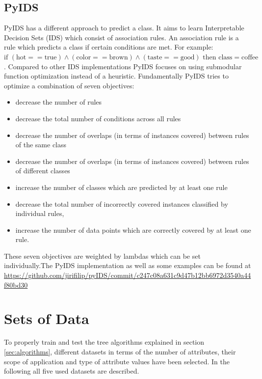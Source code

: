 \documentclass[a4paper,preprint]{sig-alternate-xt}
\begin{document}
\subsection{PyIDS}
\label{subsec:pyschwachsinn}
PyIDS has a different approach to predict a class.
It aims to learn Interpretable Decision Sets (IDS) which consist of association rules. An association rule is a rule which predicts a class if certain conditions are met. For example: $\text{if } (\text{hot}==\text{true}) \land (\text{color}==\text{brown}) \land  (\text{taste}==\text{good}) \text{ then } \text{class}=\text{coffee}$. Compared to other IDS implementations PyIDS focuses on using submodular function optimization instead of a heuristic.
Fundamentally PyIDS tries to optimize a combination of seven objectives:
\begin{itemize}
    \item decrease the number of rules
    \item decrease the total number of conditions across all rules
    \item decrease the number of overlaps (in terms of instances covered) between rules of the same class
    \item decrease the number of overlaps (in terms of instances covered) between rules of different classes
    \item increase the number of classes which are predicted by at least one rule
    \item decrease the total number of incorrectly covered instances classified by individual rules,
    \item increase the number of data points which are correctly covered by at least one rule.
\end{itemize}

These seven objectives are weighted by lambdas which can be set individually.The PyIDS implementation as well as some examples can be found at \url{https://github.com/jirifilip/pyIDS/commit/c247c08a631c9d47b12bb6972d3540a44f80bd30}

\section{Sets of Data}
\label{sec:data}
To properly train and test the tree algorithms explained in section \ref{sec:algorithms}, different datasets in terms of the number of attributes, their scope of application and type of attribute values have been selected. In the following all five used datasets are described.
\end{document}
